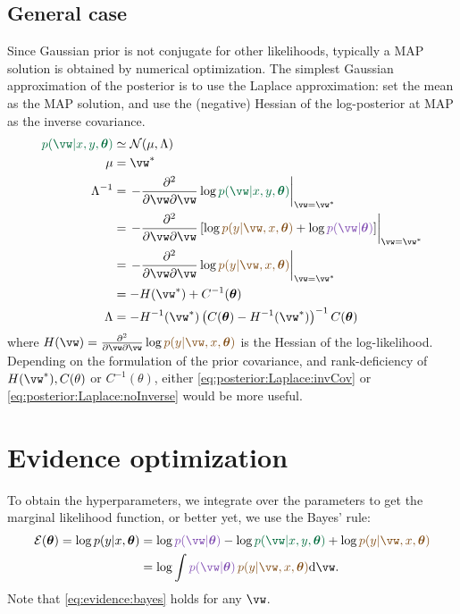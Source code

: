 \documentclass{article}
\newcounter{ct}
\newcommand{\inv}{^{-1}}
\newcommand{\Gaussian}{\ensuremath{\mathcal{N}}} %
\newcommand{\weight}{\vw}
\newcommand{\hyp}{\bm{\theta}}
\newcommand{\likelihood}{\ensuremath{\textcolor{goldenbrown}{p(y|\weight,x,\hyp)}}}
\newcommand{\prior}{\ensuremath{\textcolor{amethyst}{p(\weight|\hyp)}}}
\newcommand{\posterior}{\textcolor{cadmiumgreen}{p(\weight|x,y,\hyp)}}
\begin{document}
\subsection{General case}
Since Gaussian prior is not conjugate for other likelihoods, typically a MAP solution is obtained by numerical optimization.
The simplest Gaussian approximation of the posterior is to use the Laplace approximation: set the mean as the MAP solution, and use the (negative) Hessian of the log-posterior at MAP as the inverse covariance.
\begin{align}
    \posterior &\simeq \Gaussian(\mu, \Lambda)
    \label{eq:posterior:Laplace}
    \\
    \mu &= \weight^\ast
    \\
    \Lambda\inv &= 
	\left.
	-\frac{\partial^2}{\partial \weight \partial \weight}
	\log \posterior \right\vert_{\weight = \weight^\ast}
	\\
	&=
	\left.
	-\frac{\partial^2}{\partial \weight \partial \weight}
	\left[ \log\likelihood + \log\prior \right]
	\right\vert_{\weight = \weight^\ast}
	\\
	&=
	\left.
	-\frac{\partial^2}{\partial \weight \partial \weight}
	\log\likelihood
	\right\vert_{\weight = \weight^\ast}
	\\
	&=
	- H(\weight^\ast)
	+ C\inv(\hyp)
	\label{eq:posterior:Laplace:invCov}
	\\
    \Lambda &=
	- H\inv(\weight^\ast)
	\left(
	    C(\hyp)
	    - H\inv (\weight^\ast)
	\right)\inv
	C(\hyp)
	\label{eq:posterior:Laplace:noInverse}
\end{align}
where 
$ H(\weight) = 
    \frac{\partial^2}{\partial \weight \partial \weight}
    \log\likelihood$ is the Hessian of the log-likelihood.
Depending on the formulation of the prior covariance, and rank-deficiency of $H(\weight^\ast), C(\theta)$ or $C\inv(\theta)$, either \eqref{eq:posterior:Laplace:invCov} or \eqref{eq:posterior:Laplace:noInverse} would be more useful.

\section{Evidence optimization}
To obtain the hyperparameters, we integrate over the parameters to get the marginal likelihood function, or better yet, we use the Bayes' rule:
\begin{align}
    \mathcal{E}(\hyp) = \log p(y|x,\hyp)
	&= \log\prior - \log\posterior + \log\likelihood
	\label{eq:evidence:bayes}
	\\
	&= \log \int \prior\,\likelihood \mathrm{d}\weight.
	\label{eq:evidence:marginal}
\end{align}
Note that \eqref{eq:evidence:bayes} holds for any $\weight$.
\end{document}
